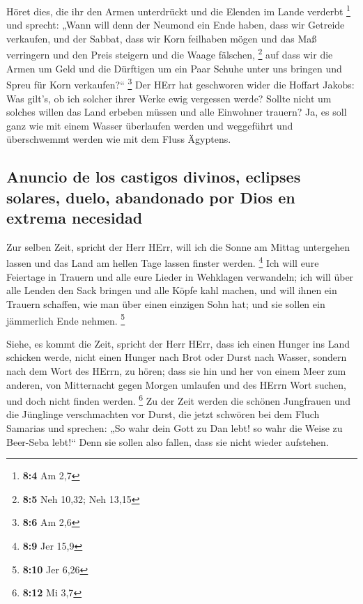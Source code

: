  Höret dies, die ihr den Armen unterdrückt und die Elenden
im Lande verderbt \footnote{\textbf{8:4} Am 2,7}  und
sprecht: „Wann will denn der Neumond ein Ende haben, dass wir Getreide
verkaufen, und der Sabbat, dass wir Korn feilhaben mögen und das Maß
verringern und den Preis steigern und die Waage fälschen, \footnote{\textbf{8:5}
  Neh 10,32; Neh 13,15}  auf dass wir die Armen um Geld
und die Dürftigen um ein Paar Schuhe unter uns bringen und Spreu für
Korn verkaufen?{}`` \footnote{\textbf{8:6} Am 2,6}  Der
HErr hat geschworen wider die Hoffart Jakobs: Was gilt's, ob ich solcher
ihrer Werke ewig vergessen werde?  Sollte nicht um solches
willen das Land erbeben müssen und alle Einwohner trauern? Ja, es soll
ganz wie mit einem Wasser überlaufen werden und weggeführt und
überschwemmt werden wie mit dem Fluss Ägyptens.

\hypertarget{anuncio-de-los-castigos-divinos-eclipses-solares-duelo-abandonado-por-dios-en-extrema-necesidad}{%
\subsection{Anuncio de los castigos divinos, eclipses solares, duelo,
abandonado por Dios en extrema
necesidad}\label{anuncio-de-los-castigos-divinos-eclipses-solares-duelo-abandonado-por-dios-en-extrema-necesidad}}

 Zur selben Zeit, spricht der Herr HErr, will ich die
Sonne am Mittag untergehen lassen und das Land am hellen Tage lassen
finster werden. \footnote{\textbf{8:9} Jer 15,9}  Ich
will eure Feiertage in Trauern und alle eure Lieder in Wehklagen
verwandeln; ich will über alle Lenden den Sack bringen und alle Köpfe
kahl machen, und will ihnen ein Trauern schaffen, wie man über einen
einzigen Sohn hat; und sie sollen ein jämmerlich Ende nehmen.
\footnote{\textbf{8:10} Jer 6,26}

 Siehe, es kommt die Zeit, spricht der Herr HErr, dass
ich einen Hunger ins Land schicken werde, nicht einen Hunger nach Brot
oder Durst nach Wasser, sondern nach dem Wort des HErrn, zu hören;
 dass sie hin und her von einem Meer zum anderen, von
Mitternacht gegen Morgen umlaufen und des HErrn Wort suchen, und doch
nicht finden werden. \footnote{\textbf{8:12} Mi 3,7}  Zu
der Zeit werden die schönen Jungfrauen und die Jünglinge verschmachten
vor Durst,  die jetzt schwören bei dem Fluch Samarias und
sprechen: „So wahr dein Gott zu Dan lebt! so wahr die Weise zu Beer-Seba
lebt!{}`` Denn sie sollen also fallen, dass sie nicht wieder aufstehen.

